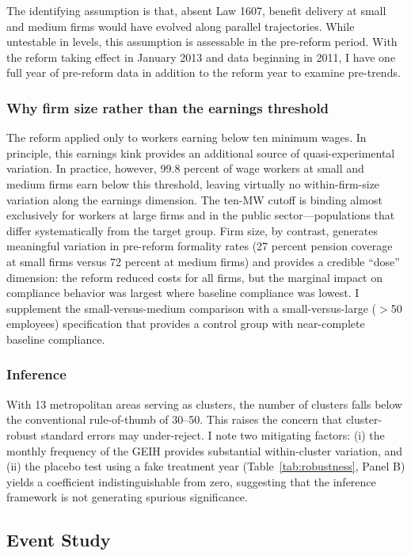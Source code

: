 \documentclass[12pt]{article}
\begin{document}
The identifying assumption is that, absent Law 1607, benefit delivery at small and medium firms would have evolved along parallel trajectories. While untestable in levels, this assumption is assessable in the pre-reform period. With the reform taking effect in January 2013 and data beginning in 2011, I have one full year of pre-reform data in addition to the reform year to examine pre-trends.

\subsubsection*{Why firm size rather than the earnings threshold} The reform applied only to workers earning below ten minimum wages. In principle, this earnings kink provides an additional source of quasi-experimental variation. In practice, however, 99.8 percent of wage workers at small and medium firms earn below this threshold, leaving virtually no within-firm-size variation along the earnings dimension. The ten-MW cutoff is binding almost exclusively for workers at large firms and in the public sector---populations that differ systematically from the target group. Firm size, by contrast, generates meaningful variation in pre-reform formality rates (27 percent pension coverage at small firms versus 72 percent at medium firms) and provides a credible ``dose'' dimension: the reform reduced costs for all firms, but the marginal impact on compliance behavior was largest where baseline compliance was lowest. I supplement the small-versus-medium comparison with a small-versus-large ($>$50 employees) specification that provides a control group with near-complete baseline compliance.

\subsubsection*{Inference} With 13 metropolitan areas serving as clusters, the number of clusters falls below the conventional rule-of-thumb of 30--50. This raises the concern that cluster-robust standard errors may under-reject. I note two mitigating factors: (i) the monthly frequency of the GEIH provides substantial within-cluster variation, and (ii) the placebo test using a fake treatment year (Table~\ref{tab:robustness}, Panel B) yields a coefficient indistinguishable from zero, suggesting that the inference framework is not generating spurious significance.

\subsection{Event Study}
\end{document}
